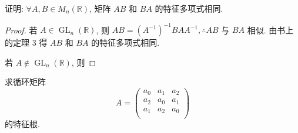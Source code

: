 \documentclass{ctexart}
\begin{document}
\begin{exercise}%
    证明: $\forall A,B\in M_n(\mathbb{R})$, 矩阵 $AB$ 和 $BA$ 的特征多项式相同.
\end{exercise}
\begin{proof}
    若 $A\in\operatorname{GL}_n(\mathbb{R})$, 则 $AB=(A^{-1})^{-1}BAA^{-1},\therefore AB$ 与 $BA$ 相似. 由书上的定理 3 得 $AB$ 和 $BA$ 的特征多项式相同.

    若 $A\notin\operatorname{GL}_n(\mathbb{R})$, 则 %
\end{proof}
\begin{exercise}%
    求循环矩阵
    \[A=\begin{pmatrix}
        a_0 & a_1 & a_2 \\
        a_2 & a_0 & a_1 \\
        a_1 & a_2 & a_0 \\
    \end{pmatrix}\]
    的特征根.
\end{exercise}
\end{document}
